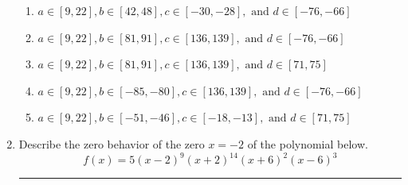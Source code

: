 \documentclass[14pt]{extbook}
\newcommand{\litem}[1]{\item#1\hspace*{-1cm}\rule{\textwidth}{0.4pt}}
\begin{document}
\begin{enumerate}
{\begin{enumerate}[label=\Alph*.]
\item \( a \in [9, 22], b \in [42, 48], c \in [-30, -28], \text{ and } d \in [-76, -66] \)
\item \( a \in [9, 22], b \in [81, 91], c \in [136, 139], \text{ and } d \in [-76, -66] \)
\item \( a \in [9, 22], b \in [81, 91], c \in [136, 139], \text{ and } d \in [71, 75] \)
\item \( a \in [9, 22], b \in [-85, -80], c \in [136, 139], \text{ and } d \in [-76, -66] \)
\item \( a \in [9, 22], b \in [-51, -46], c \in [-18, -13], \text{ and } d \in [71, 75] \)

\end{enumerate} }
\litem{
Describe the zero behavior of the zero $x = -2$ of the polynomial below.\[ f(x) = 5(x - 2)^{9}(x + 2)^{14}(x + 6)^{2}(x - 6)^{3} \]\begin{enumerate}[label=\Alph*.]

\end{enumerate}}
\end{enumerate}
\end{document}
